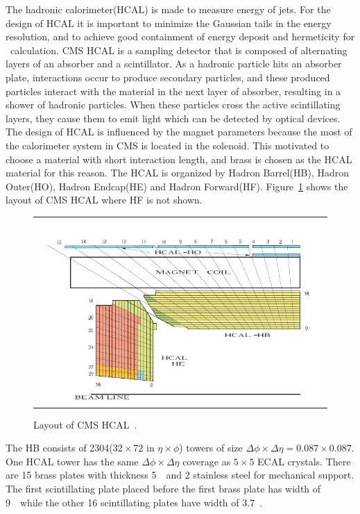 The hadronic calorimeter(HCAL) is made to measure energy of jets.
For the design of HCAL it is important to minimize the Gaussian tails in the energy 
resolution, and to achieve good containment of energy deposit and 
hermeticity for \met\ calculation. CMS HCAL is a sampling detector 
that is composed of alternating layers of an absorber and a scintillator. 
As a hadronic particle hits an absorber plate, interactions occur to produce 
secondary particles, and these produced particles interact with 
the material in the next layer of absorber, resulting in a shower of 
hadronic particles. When these particles cross the active scintillating  
layers, they cause them to emit light which can be detected by 
optical devices. 
The design of HCAL is influenced by the magnet parameters because 
the most of the calorimeter system in CMS is located in the solenoid.
This motivated to choose a material with short interaction length,
and brass is chosen as the HCAL material for this reason. 
The HCAL is organized by Hadron Barrel(HB), Hadron Outer(HO), Hadron Endcap(HE) 
and Hadron Forward(HF).  
Figure~\ref{fig:hcal_layout} shows the layout of CMS HCAL where HF is not shown. 
%
\begin{figure}[h] 
\vspace{1cm}
\centering 
\begin{tabular}{|c|} 
\hline
\\
\includegraphics[width=0.99\textwidth]{figures/Hcal-segementation-updated.JPG}\\
\hline
\end{tabular} 
\caption{Layout of CMS HCAL~\cite{Chatrchyan:2009hw}.}
\label{fig:hcal_layout} 
\end{figure} 

The HB consists of 2304($32 \times 72$ in $\eta \times \phi$) towers of size 
$\Delta \phi \times \Delta \eta = 0.087 \times 0.087$. One HCAL tower 
has the same $\Delta \phi \times \Delta \eta$ coverage as $5\times5$
ECAL crystals. There are 15 brass plates with thickness 5~\cm\ and 
2 stainless steel for mechanical support. The first scintillating 
plate placed before the first brass plate has width of 9~\mm\ while 
the other 16 scintillating plates have width of 3.7~\mm. 

